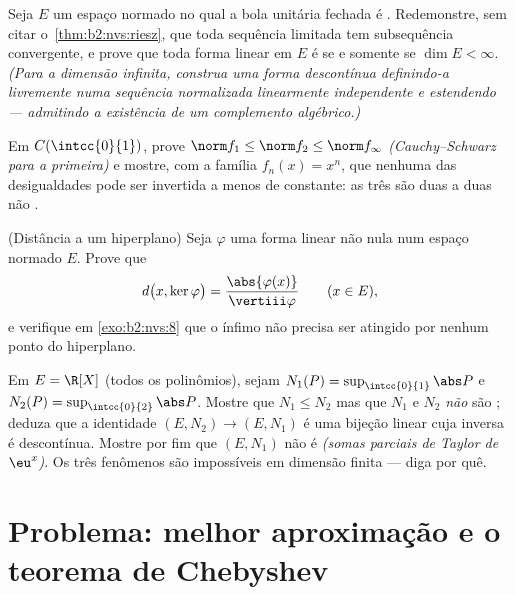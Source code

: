 \begin{exercise}[$\star\star\star$]\label{exo:b2:nvs:9}
Seja $E$ um espaço normado no qual a bola unitária fechada é .
Redemonstre, sem citar o~\cref{thm:b2:nvs:riesz}, que toda
sequência limitada tem subsequência convergente, e prove que toda
forma linear em $E$ é  se e somente se $\dim E < \infty$.
\emph{(Para a dimensão infinita, construa uma forma descontínua
definindo-a livremente numa sequência normalizada linearmente independente
e estendendo --- admitindo a existência de um complemento
algébrico.)}
\end{exercise}

\begin{exercise}[$\star\star$]\label{exo:b2:nvs:10}
Em $C(\intcc{0}{1})$, prove $\norm f_1 \leq \norm f_2 \leq \norm
f_\infty$ \emph{(Cauchy--Schwarz para a primeira)} e mostre, com
a família $f_n(x) = x^n$, que nenhuma das desigualdades pode ser invertida
a menos de constante: as três  são duas a duas não .
\end{exercise}

\begin{exercise}[$\star\star$]\label{exo:b2:nvs:11}
(Distância a um hiperplano) Seja $\varphi$ uma forma linear 
não nula num espaço normado $E$. Prove que
\[
d\bigl(x, \ker\varphi\bigr) =
\frac{\abs{\varphi(x)}}{\vertiii\varphi}
\qquad (x \in E),
\]
e verifique em \cref{exo:b2:nvs:8} que o ínfimo não precisa ser
atingido por nenhum ponto do hiperplano.
\end{exercise}

\begin{exercise}[$\star\star\star$]\label{exo:b2:nvs:12}
Em $E = \R[X]$ (todos os polinômios), sejam $N_1(P) =
\sup_{\intcc{0}{1}}\abs P$ e $N_2(P) =
\sup_{\intcc{0}{2}}\abs P$. Mostre que $N_1 \leq N_2$ mas que
$N_1$ e $N_2$ \emph{não} são ; deduza que a
identidade $(E, N_2) \to (E, N_1)$ é uma bijeção linear 
cuja inversa é descontínua. Mostre por fim que $(E, N_1)$ não é
 \emph{(somas parciais de Taylor de $\eu^x$)}. Os três
fenômenos são impossíveis em dimensão finita --- diga por quê.
\end{exercise}

\section{Problema: melhor aproximação e o teorema de Chebyshev}


